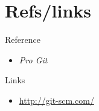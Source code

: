 \documentclass[bigger, presentation]{beamer}
\begin{document}
\section{Refs/links}
\label{sec-14}
\begin{frame}
\begin{block}{Reference}
\label{sec-14-1-1}

\begin{itemize}
\item \emph{Pro Git}
\end{itemize}
\end{block}
\begin{block}{Links}
\label{sec-14-1-2}

\begin{itemize}
\item \href{http://www.emacswiki.org/emacs/}{http://git-scm.com/}
\end{itemize}
\end{block}
\end{frame}
\end{document}
